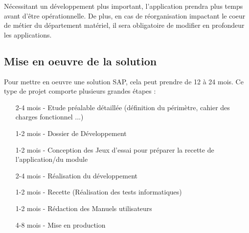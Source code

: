 Nécessitant un développement plus important, l'application prendra plus temps
avant d'être opérationnelle. De plus, en cas de réorganisation
impactant le coeur de métier du département matériel, il sera obligatoire de modifier
en profondeur les applications. 

\subsection{Mise en oeuvre de la solution}
Pour mettre en oeuvre une solution SAP, cela peut prendre de 12 à 24 mois.
Ce type de projet comporte plusieurs grandes étapes :

\begin{itemize}
	\item[2-4 mois -] Etude préalable détaillée (définition du périmètre, cahier des charges fonctionnel ...)
	\item[1-2 mois -] Dossier de Développement
	\item[1-2 mois -] Conception des Jeux d’essai pour préparer la recette de l'application/du module
	\item[2-4 mois -] Réalisation du développement
	\item[1-2 mois -] Recette (Réalisation des tests informatiques)
	\item[1-2 mois -] Rédaction des Manuels utilisateurs
	\item[4-8 mois -] Mise en production
\end{itemize}
